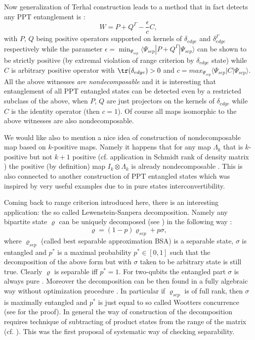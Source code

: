 \documentclass[twocolumn,aps,rmp]{revtex4}
\begin{document}
Now generalization of Terhal construction leads to a method that in
fact detects any PPT entanglement is \cite{Lewenstein00b}:
\begin{equation}
W= P + Q^{\Gamma}-\frac{\epsilon}{c}C,
\end{equation}
with $P$, $Q$ being positive operators supported on kernels of
$\delta_{edge}$ and $\delta_{edge}^{\Gamma}$ respectively while the
parameter $\epsilon=\min_{\Psi_{sep}}\langle \Psi_{sep}|P + Q^{\Gamma}
| \Psi_{sep}\rangle$ can be shown to be strictly positive (by extremal
violation of range criterion by $\delta_{edge}$ state) while $C$ is
arbitrary positive operator with ${\tr}(\delta_{edge})>0$ and
$c=max_{\Psi_{sep}}\langle \Psi_{sep}|C| \Psi_{sep}\rangle$. All the
above witnesses {\it are nondecomposable } and it is interesting that
entanglement of all PPT entangled states can be detected even by a
restricted subclass of the above, when $P$, $Q$ are just projectors on
the kernels of $\delta_{edge}$ while $C$ is the identity operator
(then $c=1$). Of course all maps isomorphic to the above witnesses are
also nondecomposable.

We would like also to mention a nice idea of construction of
nondecomposable map based on $k$-positive maps. Namely it happens that
for any map $\Lambda_{k}$ that is $k$-positive but not $k+1$ positive
(cf. application in Schmidt rank of density matrix
\cite{Terhal-Pawel-rank}) the positive (by definition) map $I_{k}
\otimes \Lambda_{k}$ is already nondecomposable \cite{PianiM}. This is
also connected to another construction of PPT entangled states
\cite{PianiM} which was inspired by very useful examples due to
\cite{Ishizaka04} in pure states interconvertibility.

Coming back to range criterion introduced here, there is an
interesting application: the so called Lewenstein-Sanpera
decomposition. Namely any bipartite state $ \varrho $ can be uniquely
decomposed (see \cite{KarnasL2000-bsa}) in the following way
\cite{LewensteinSanpera-bsa}:
\begin{equation}
\varrho=(1-p)\varrho_{sep}+ p \sigma,
\end{equation}
where $\varrho_{sep}$ (called best separable approximation BSA) is a
separable state, $\sigma$ is entangled and $p^{*}$ is a maximal
probability $p^{*}\in [0,1]$ such that the decomposition of the above
form but with $\sigma$ taken to be arbitrary state is still
true. Clearly $\varrho$ is separable iff $p^{*}=1$.  For two-qubits
the entangled part $\sigma$ is always pure
\cite{LewensteinSanpera-bsa}.  Moreover the decomposition can be then
found in a fully algebraic way without optimization procedure
\cite{WellensKus}. In particular if $\varrho_{sep}$ is of full rank,
then $\sigma$ is maximally entangled and $p^{*}$ is just equal to so
called Wootters concurrence (see \cite{WellensKus} for the proof). In
general the way of construction of the decomposition requires
technique of subtracting of product states from the range of the
matrix \cite{LewensteinSanpera-bsa} (cf.  \cite{Karnas,Ho00}). This
was the first proposal of systematic way of checking separability.
\end{document}

